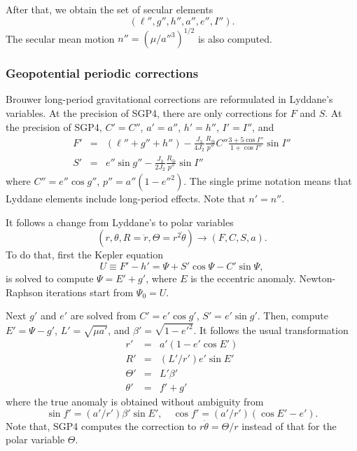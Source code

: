 \documentclass{article}
\begin{document}
After that, we obtain the set of secular elements
\[
(\ell'',g'',h'',a'',e'',I'').
\]
The secular mean motion $n''=(\mu/a''^3)^{1/2}$ is also computed.

\subsubsection{Geopotential periodic corrections} \label{s:SGP4lp}


Brouwer long-period gravitational corrections are reformulated in Lyddane's variables. At the precision of SGP4, there are only corrections for $F$ and $S$. At the precision of SGP4, $C'= C''$, $a'=a''$, $h'=h''$, $I'=I''$, and
\begin{eqnarray*}
F' &=& (\ell''+g''+h'')-\frac{J_3}{4J_2}\frac{R_\oplus}{p''}C''\frac{3+5\cos{I}''}{1+\cos{I}''}\sin{I}'' \\
S' &=&  e''\sin{g}'' -\frac{J_3}{2J_2}\frac{R_\oplus}{p''}\sin{I}''
\end{eqnarray*}
where $C''=e''\cos{g}''$, $p''=a''(1-e''^2)$. The single prime notation means that Lyddane elements include long-period effects. Note that $n'=n''$.



It follows a change from Lyddane's to polar variables
\[
(r,\theta,R=\dot{r},\Theta=r^2\dot\theta)\longrightarrow(F,C,S,a).
\]
To do that, first the Kepler equation
\[
U\equiv{F'-h'}=\Psi+S'\cos\Psi-C'\sin\Psi,
\]
is solved to compute $\Psi=E'+g'$, where $E$ is the eccentric anomaly. Newton-Raphson iterations start from $\Psi_0=U$.

Next $g'$ and $e'$ are solved from $C'=e'\cos{g'}$, $S'=e'\sin{g}'$. Then, compute $E'=\Psi-g'$, $L'=\sqrt{\mu{a}'}$, and $\beta'=\sqrt{1-e'^2}$. It follows the usual transformation
\begin{eqnarray} \label{utor}
r' &=& a'(1-e'\cos{E}') \\
R' &=& (L'/r')e'\sin{E}' \\
\Theta' &=& L'\beta' \\
\theta' &=& f'+g'
\end{eqnarray}
where the true anomaly is obtained without ambiguity from
\begin{equation} \label{utof}
\sin{f}'=(a'/r')\beta'\sin{E}',\quad \cos{f}'=(a'/r')(\cos{E}'-e').
\end{equation}
Note that, SGP4 computes the correction to $r\dot\theta=\Theta/r$ instead of that for the polar variable $\Theta$.
\end{document}
